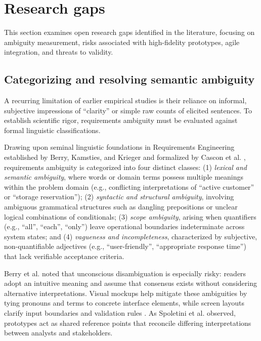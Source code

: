 \section{Research gaps}
\label{sec:gaps}

This section examines open research gaps identified in the literature, focusing on ambiguity measurement, risks associated with high-fidelity prototypes, agile integration, and threats to validity.

\subsection{Categorizing and resolving semantic ambiguity}
A recurring limitation of earlier empirical studies is their reliance on informal, subjective impressions of ``clarity'' or simple raw counts of elicited sentences. To establish scientific rigor, requirements ambiguity must be evaluated against formal linguistic classifications.

Drawing upon seminal linguistic foundations in Requirements Engineering established by Berry, Kamsties, and Krieger \cite{berry2003contract} and formalized by Cascon et al. \cite{cascon2025ambiguity}, requirements ambiguity is categorized into four distinct classes: (1) \textit{lexical and semantic ambiguity}, where words or domain terms possess multiple meanings within the problem domain (e.g., conflicting interpretations of ``active customer'' or ``storage reservation''); (2) \textit{syntactic and structural ambiguity}, involving ambiguous grammatical structures such as dangling prepositions or unclear logical combinations of conditionals; (3) \textit{scope ambiguity}, arising when quantifiers (e.g., ``all'', ``each'', ``only'') leave operational boundaries indeterminate across system states; and (4) \textit{vagueness and incompleteness}, characterized by subjective, non-quantifiable adjectives (e.g., ``user-friendly'', ``appropriate response time'') that lack verifiable acceptance criteria.

Berry et al. \cite{berry2003contract} noted that unconscious disambiguation is especially risky: readers adopt an intuitive meaning and assume that consensus exists without considering alternative interpretations. Visual mockups help mitigate these ambiguities by tying pronouns and terms to concrete interface elements, while screen layouts clarify input boundaries and validation rules \cite{ferrari2016ambiguity, cascon2025ambiguity, berry2003contract}. As Spoletini et al. \cite{spoletini2018interview} observed, prototypes act as shared reference points that reconcile differing interpretations between analysts and stakeholders.


